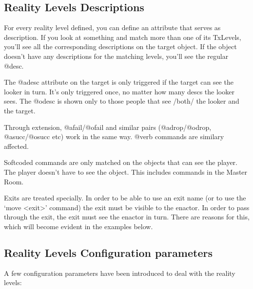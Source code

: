 \documentclass[letterpaper,10pt,english]{sphinxmanual}
\begin{document}
\subsection{Reality Levels Descriptions}
\label{\detokenize{advanced:reality-levels-descriptions}}
\sphinxAtStartPar
For every reality level defined, you can define an attribute that serves as
description. If you look at something and match more than one of its
TxLevels, you’ll see all the corresponding descriptions on the target
object. If the object doesn’t have any descriptions for the matching levels,
you’ll see the regular @desc.

\sphinxAtStartPar
The @adesc attribute on the target is only triggered if the target can see
the looker in turn. It’s only triggered once, no matter how many descs the
looker sees. The @odesc is shown only to those people that see /both/ the
looker and the target.

\sphinxAtStartPar
Through extension, @afail/@ofail and similar pairs (@adrop/@odrop,
@asucc/@osucc etc) work in the same way. @verb commands are similary
affected.

\sphinxAtStartPar
Softcoded commands are only matched on the objects that can see the player.
The player doesn’t have to see the object. This includes commands in the
Master Room.

\sphinxAtStartPar
Exits are treated specially. In order to be able to use an exit name (or to
use the ‘move \textless{}exit\textgreater{}’ command) the exit must be visible to the enactor. In
order to pass through the exit, the exit must see the enactor in turn. There
are reasons for this, which will become evident in the examples below.


\subsection{Reality Levels Configuration parameters}
\label{\detokenize{advanced:reality-levels-configuration-parameters}}
\sphinxAtStartPar
A few configuration parameters have been introduced to deal with the reality
levels:

\begin{sphinxVerbatim}[commandchars=\\\{\}]
   \PYG{p}{[}  \PYG{p}{]}
\end{sphinxVerbatim}
\end{document}

